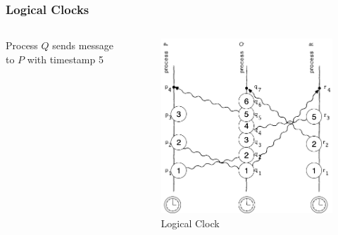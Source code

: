 \documentclass{beamer}
\begin{document}
\frame
{
	\frametitle{Logical Clocks}

	\begin{columns}
	\begin{column}{0.6\textwidth}

		Process $Q$ sends message to $P$ with timestamp 5


	\end{column}
	\begin{column}{0.4\textwidth}

		\begin{figure}[ht!]
		\includegraphics[width=\textwidth]{files/ClockDist-Impl-Logical-Clock-5.png}
		\caption{Logical Clock}
		\end{figure}


	\end{column}
	\end{columns}


}
\end{document}
